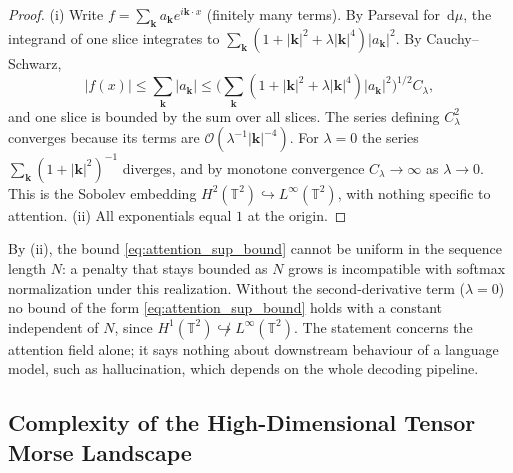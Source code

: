 \documentclass[11pt,a4paper,reqno]{amsart}
\theoremstyle{definition}
\numberwithin{equation}{section}
\newcommand{\Tor}{\mathbb{T}}
\newcommand{\dif}{\,\mathrm{d}}
\begin{document}
\begin{proof}
(i) Write $f = \sum_{\mathbf{k}} a_{\mathbf{k}} e^{i \mathbf{k}\cdot x}$ (finitely many terms). By Parseval for $\dif\mu$, the integrand of one slice integrates to $\sum_{\mathbf{k}} (1 + |\mathbf{k}|^2 + \lambda |\mathbf{k}|^4) |a_{\mathbf{k}}|^2$. By Cauchy--Schwarz,
\[
|f(x)| \le \sum_{\mathbf{k}} |a_{\mathbf{k}}| \le \Big( \sum_{\mathbf{k}} (1 + |\mathbf{k}|^2 + \lambda |\mathbf{k}|^4) |a_{\mathbf{k}}|^2 \Big)^{1/2} C_\lambda,
\]
and one slice is bounded by the sum over all slices. The series defining $C_\lambda^2$ converges because its terms are $\mathcal{O}(\lambda^{-1}|\mathbf{k}|^{-4})$. For $\lambda = 0$ the series $\sum_{\mathbf{k}} (1 + |\mathbf{k}|^2)^{-1}$ diverges, and by monotone convergence $C_\lambda \to \infty$ as $\lambda \to 0$. This is the Sobolev embedding $H^2(\Tor^2) \hookrightarrow L^\infty(\Tor^2)$, with nothing specific to attention. (ii) All exponentials equal $1$ at the origin.
\end{proof}

By (ii), the bound \eqref{eq:attention_sup_bound} cannot be uniform in the sequence length $N$: a penalty that stays bounded as $N$ grows is incompatible with softmax normalization under this realization. Without the second-derivative term ($\lambda = 0$) no bound of the form \eqref{eq:attention_sup_bound} holds with a constant independent of $N$, since $H^1(\Tor^2) \not\hookrightarrow L^\infty(\Tor^2)$. The statement concerns the attention field alone; it says nothing about downstream behaviour of a language model, such as hallucination, which depends on the whole decoding pipeline.

\subsection{Complexity of the High-Dimensional Tensor Morse Landscape}
\label{subsec:kac_rice_tensors}
\end{document}
